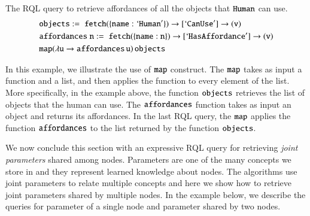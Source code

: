 \begin{example}
The RQL query to retrieve affordances of all the objects that ${\tt{Human}}$ can use.
{\small
\begin{align*}
&  {\tt objects }:=\; {\tt fetch (\{name:`Human'\})\rightarrow [`CanUse'] \rightarrow (v)} \\
&  {\tt affordances \;n } := \;{\tt fetch (\{name:n\})\rightarrow [`Has Affordance'] \rightarrow (v)} \\
&  {\tt map(\lambda u \rightarrow affordances \, u) \,  objects} \\
\end{align*}
}

\noindent In this example, we illustrate the use of ${\tt map}$ construct. The ${\tt map}$ takes as input a function and a list, and then applies the function to every element of the list. More specifically, in the example above, the function ${\tt objects }$ retrieves the list of objects that the human can use. The ${\tt affordances }$ function takes as input an object and returns its affordances. In the last RQL query, the ${\tt map}$  applies the function ${\tt affordances}$ to the list returned by the function ${\tt objects}$.
\end{example}
We now conclude this section with an expressive RQL query for retrieving \textit{joint parameters} shared among nodes. Parameters are one of the many concepts we store in \robobrain{} and they represent learned knowledge about nodes. The algorithms use joint parameters to relate multiple concepts and here we show how to retrieve joint parameters shared by multiple nodes. In the example below, we describe the queries for parameter of a single node and parameter shared by two nodes.

